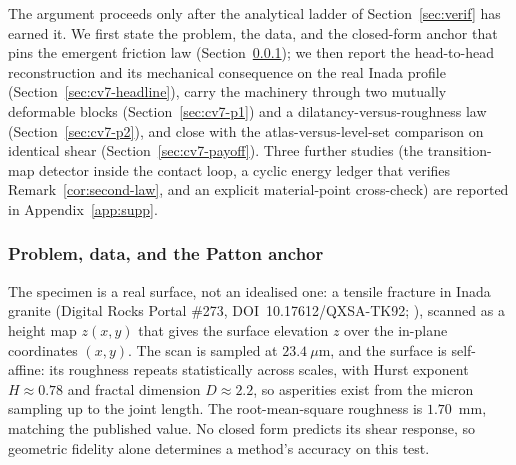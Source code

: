 \documentclass{svjour3}                 %
\begin{document}
The argument proceeds only after the analytical ladder of Section~\ref{sec:verif} has earned it.
We first state the problem, the data, and the closed-form anchor that pins the emergent friction law
(Section~\ref{sec:cv7-data}); we then report the head-to-head reconstruction and its mechanical consequence on
the real Inada profile (Section~\ref{sec:cv7-headline}), carry the machinery through two mutually deformable
blocks (Section~\ref{sec:cv7-p1}) and a dilatancy-versus-roughness law (Section~\ref{sec:cv7-p2}), and close
with the atlas-versus-level-set comparison on identical shear (Section~\ref{sec:cv7-payoff}). Three further
studies (the transition-map detector inside the contact loop, a cyclic energy ledger that verifies
Remark~\ref{cor:second-law}, and an explicit material-point cross-check) are reported in
Appendix~\ref{app:supp}.

\subsubsection{Problem, data, and the Patton anchor}\label{sec:cv7-data}

The specimen is a real surface, not an idealised one: a tensile fracture in Inada granite (Digital Rocks Portal \#273, DOI~10.17612/QXSA-TK92; \citealp{inada2020digitalrocks}), scanned as a height map $z(x,y)$ that gives the surface elevation $z$ over the in-plane coordinates $(x,y)$. The scan is sampled at $23.4~\mu$m, and the surface is self-affine: its roughness repeats statistically across scales, with Hurst exponent $H\approx0.78$ and fractal dimension $D\approx2.2$, so asperities exist from the micron sampling up to the joint length. The root-mean-square roughness is $1.70$~mm, matching the published value. No closed form predicts its shear response, so geometric fidelity alone determines a method's accuracy on this test.
\end{document}
